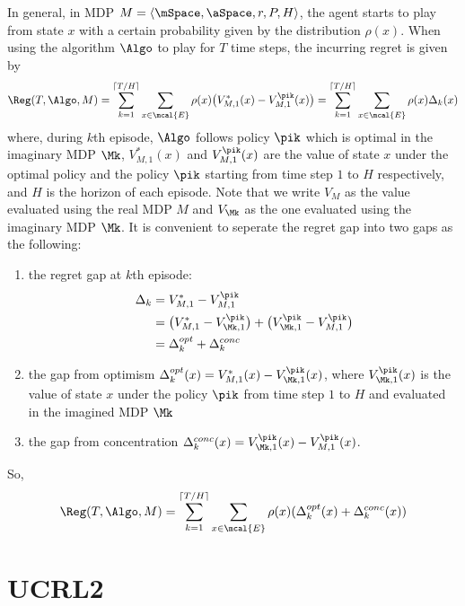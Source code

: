     In general, in MDP $M=\langle\mSpace,\aSpace,r,P,H\rangle$, the agent starts to play from state $x$ with a certain probability given by the distribution $\rho(x)$. When using the algorithm $\Algo$ to play for $T$ time steps, the incurring regret is given by
    \begin{align}
        \Reg(T,\Algo,M)=\sum_{k=1}^{\lceil T/H\rceil}\sum_{x\in\mcal{E}}\rho(x)\big(V_{M,1}^*(x) -V_{M,1}^{\pik}(x)\big) =\sum_{k=1}^{\lceil T/H\rceil}\sum_{x\in\mcal{E}}\rho(x)\Delta_k(x)
    \end{align}
    where, during $k$th episode, $\Algo$ follows policy $\pik$ which is optimal in the imaginary MDP $\Mk$, $V^*_{M,1}(x)$ and $V_{M,1}^{\pik}(x)$ are the value of state $x$ under the optimal policy and the policy $\pik$ starting from time step $1$ to $H$ respectively, and $H$ is the horizon of each episode.
    Note that we write $V_M$ as the value evaluated using the real MDP $M$ and $V_{\Mk}$ as the one evaluated using the imaginary MDP $\Mk$. It is convenient to seperate the regret gap into two gaps as the following:
    \begin{enumerate}
        \item the regret gap at $k$th episode:
        \begin{align*}
        \Delta_k &=V_{M,1}^* -V_{M,1}^{\pik} \\
        &=\big(V^*_{M,1} -V^{\pik}_{\Mk,1}\big) +\big(V^{\pik}_{\Mk,1} -V_{M,1}^{\pik}\big) \\
        &=\Delta_k^{opt}+\Delta_k^{conc}
        \end{align*}
    \item the gap from optimism $\Delta_k^{opt}(x)=V^*_{M,1}(x) -V^{\pik}_{\Mk,1}(x)$, where $V^{\pik}_{\Mk,1}(x)$ is the value of state $x$ under the policy $\pik$ from time step $1$ to $H$ and evaluated in the imagined MDP $\Mk$
    \item the gap from concentration $\Delta_k^{conc}(x)=V^{\pik}_{\Mk,1}(x) -V_{M,1}^{\pik}(x)$.
    \end{enumerate}
    So,
    \begin{equation}
    \label{eq:eq_6}
    \Reg(T,\Algo,M)= \sum_{k=1}^{\lceil T/H\rceil}\sum_{x\in\mcal{E}}\rho(x)(\Delta_k^{opt}(x)+\Delta_k^{conc}(x))
    \end{equation}

\section{UCRL2}
\label{sec:ucrl2}

